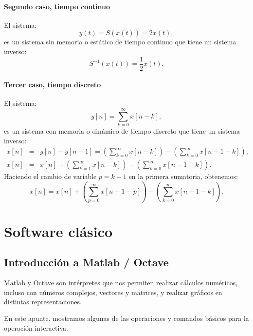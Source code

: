 \documentclass[11pt,a4paper,openany]{book}
\begin{document}
\subsubsection{Segundo caso, tiempo continuo}
El sistema:
\begin{equation}
	y(t) = S(x(t)) = 2 x(t),
\end{equation}
es un sistema sin memoria o estático de tiempo continuo que tiene un sistema inverso:
\begin{equation}
	S^{-1}(x(t)) = \frac{1}{2} x(t).
\end{equation}

\subsubsection{Tercer caso, tiempo discreto}
El sistema:
\begin{equation}
	y[n] = \sum_{k=0}^{\infty} x[n-k],
\end{equation}
es un sistema con memoria o dinámico de tiempo discreto que tiene un sistema inverso:
\begin{eqnarray}
	x[n] &=& y[n] - y[n-1] = \left(\sum_{k=0}^{\infty} x[n-k]\right) - \left( \sum_{k=0}^{\infty}x[n-1-k]\right), \\
	x[n] &=& x[n] + \left( \sum_{k=1}^{\infty} x[n-k]\right) - \left(\sum_{k=0}^{\infty}x[n-1-k]\right).
\end{eqnarray}
Haciendo el cambio de variable $p = k - 1$ en la primera sumatoria, obtenemos:
\begin{equation}
	x[n] = x[n] + \left( \sum_{p=0}^{\infty} x[n-1-p]\right) - \left(\sum_{k=0}^{\infty} x[n-1-k]\right).
\end{equation}
	
\chapter{Software clásico}

\section{Introducción a Matlab / Octave}

Matlab y Octave son intérpretes que nos permiten realizar cálculos numéricos, incluso con números complejos, vectores y matrices, y realizar gráficos en distintas representaciones.

En este apunte, mostramos algunas de las operaciones y comandos básicos para la operación interactiva. 
\end{document}

